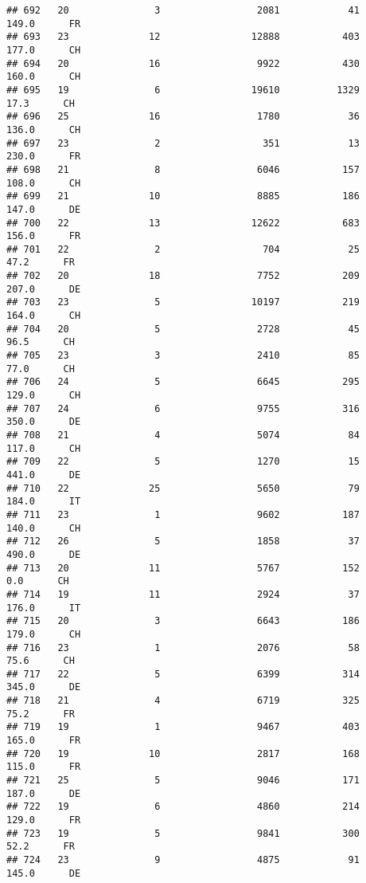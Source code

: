 \documentclass[
]{article}
\begin{document}
\begin{verbatim}
## 692   20               3                 2081            41    149.0      FR
## 693   23              12                12888           403    177.0      CH
## 694   20              16                 9922           430    160.0      CH
## 695   19               6                19610          1329     17.3      CH
## 696   25              16                 1780            36    136.0      CH
## 697   23               2                  351            13    230.0      FR
## 698   21               8                 6046           157    108.0      CH
## 699   21              10                 8885           186    147.0      DE
## 700   22              13                12622           683    156.0      FR
## 701   22               2                  704            25     47.2      FR
## 702   20              18                 7752           209    207.0      DE
## 703   23               5                10197           219    164.0      CH
## 704   20               5                 2728            45     96.5      CH
## 705   23               3                 2410            85     77.0      CH
## 706   24               5                 6645           295    129.0      CH
## 707   24               6                 9755           316    350.0      DE
## 708   21               4                 5074            84    117.0      CH
## 709   22               5                 1270            15    441.0      DE
## 710   22              25                 5650            79    184.0      IT
## 711   23               1                 9602           187    140.0      CH
## 712   26               5                 1858            37    490.0      DE
## 713   20              11                 5767           152      0.0      CH
## 714   19              11                 2924            37    176.0      IT
## 715   20               3                 6643           186    179.0      CH
## 716   23               1                 2076            58     75.6      CH
## 717   22               5                 6399           314    345.0      DE
## 718   21               4                 6719           325     75.2      FR
## 719   19               1                 9467           403    165.0      FR
## 720   19              10                 2817           168    115.0      FR
## 721   25               5                 9046           171    187.0      DE
## 722   19               6                 4860           214    129.0      FR
## 723   19               5                 9841           300     52.2      FR
## 724   23               9                 4875            91    145.0      DE

\end{verbatim}
\end{document}
